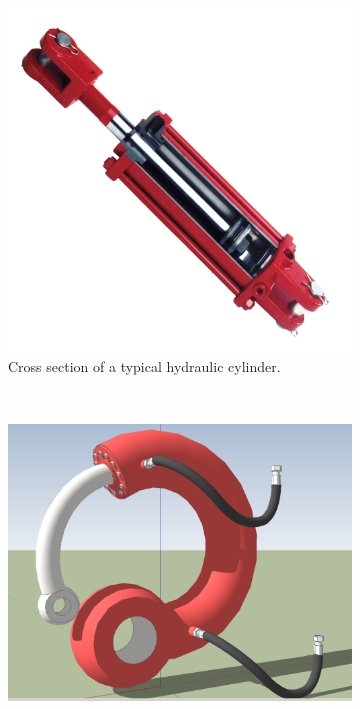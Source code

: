 \begin{figure}[htbp]
        \centering
        \begin{subfigure}[b]{0.3\textwidth}
                \includegraphics[width=\textwidth]{images/h_pump}
                \caption{Cross section of a typical hydraulic cylinder.}
                \label{fig:h_pump}
        \end{subfigure}%
        ~ %
        \begin{subfigure}[b]{0.3\textwidth}
                \includegraphics[width=\textwidth]{images/piston}

\end{subfigure}
\end{figure}
